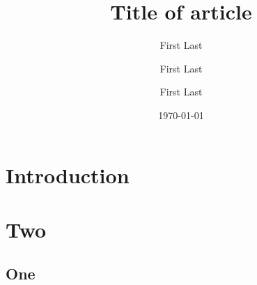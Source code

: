\documentclass[aip,jcp,amsmath,amssymb,floatfix,letterpaper,groupedaddress,
reprint,  %
]{revtex4-1}
\begin{document}
\title{Title of article}

\author{First Last}
\author{First Last}
\author{First Last}
\date{\today}

\begin{abstract}
  \lipsum[3]
\end{abstract}

\keywords{}

\maketitle

\section{\label{sec:Introduction}Introduction}
\lipsum[41-46]
\section{\label{sec:Two}Two}
\lipsum[47-52]
\subsection{\label{sec:Two_One}One}
\lipsum[53-60]
\end{document}
